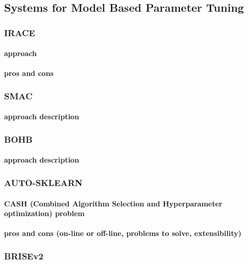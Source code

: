 \subsection{Systems for Model Based Parameter Tuning}\label{bg: parameter tuning expamples}

\subsubsection{IRACE}
\paragraph{approach} \cite{irace:lopez2016irace}
\paragraph{pros and cons}

\subsubsection{SMAC}
\paragraph{approach description}

\subsubsection{BOHB}
\paragraph{approach description}

\subsubsection{AUTO-SKLEARN}
\paragraph{CASH (Combined Algorithm Selection and Hyperparameter optimization) problem}
\paragraph{pros and cons (on-line or off-line, problems to solve, extensibility)}\cite{autosklearn:feurer2015efficient}

\subsubsection{BRISEv2}
